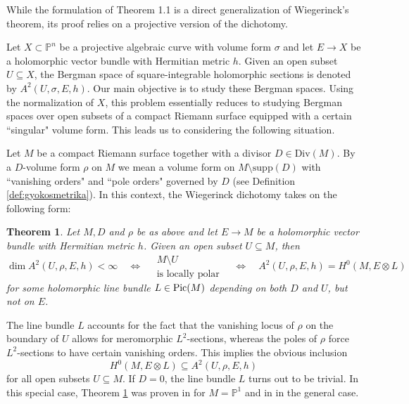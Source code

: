 \documentclass[11pt]{amsart}
\newtheorem{theorem}{Theorem}[section]
\theoremstyle{definition}
\begin{document}
\noindent While the formulation of Theorem 1.1 is a direct generalization of Wiegerinck’s theorem, its
proof relies on a projective version of the dichotomy.

Let $X \subset \mathbb{P}^n$ be a projective algebraic curve with volume form $\sigma$ and let $E \to X$ be a holomorphic vector bundle with Hermitian metric $h$. Given an open subset $U \subseteq X$, the Bergman space of square-integrable holomorphic sections is denoted by $A^2(U,\sigma,E,h)$. Our main objective is to study these Bergman spaces. Using the normalization of $X$, this problem essentially reduces to studying Bergman spaces over open subsets of a compact Riemann surface equipped with a certain ``singular" volume form. This leads us to considering the following situation.

Let $M$ be a compact Riemann surface together with a divisor $D \in \text{Div}(M)$. By a
$D$-volume form $\rho$ on $M$ we mean a volume form on $M \setminus \text{supp}(D)$ with ``vanishing orders" and ``pole orders" governed by $D$ (see Definition \ref{def:gyokosmetrika}). In this context, the Wiegerinck dichotomy takes on the following form:

\begin{theorem}\label{intr:main}
    \textit{Let $M, D$ and $\rho$ be as above and let $E \to M$ be a holomorphic vector bundle with Hermitian metric $h$. Given an open subset $U \subseteq M$, then} 
        $$\dim A^2(U,\rho,E,h) < \infty \quad \Leftrightarrow \quad \begin{array}{c}
        M \setminus U\\
        \text{is locally polar}
        \end{array} \quad \Leftrightarrow \quad A^2(U,\rho,E,h) = H^0(M,E\otimes L)$$
        \textit{for some holomorphic line bundle $L \in \text{\normalfont Pic}(M)$ depending on both $D$ and $U$, but not on $E$.}
\end{theorem}

\noindent The line bundle $L$ accounts for the fact that the vanishing locus of $\rho$ on the boundary of $U$ allows for meromorphic $L^2$-sections, whereas the poles of $\rho$ force $L^2$-sections to have certain vanishing orders. This implies the obvious inclusion
$$H^0(M,E\otimes L) \subseteq A^2(U,\rho,E,h)$$
for all open subsets $U \subseteq M$. If $D=0$, the line bundle $L$ turns out to be trivial. In this special case, Theorem \ref{intr:main} was proven in \cite{Sz22, GGV22} for $M=\mathbb{P}^1$ and in \cite{GGV24} in the general case.
\end{document}
